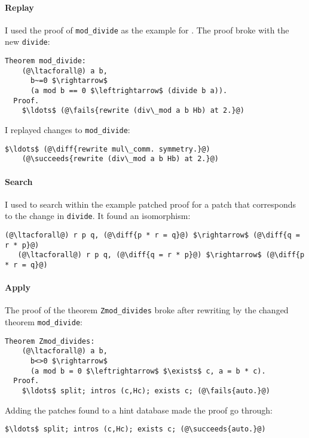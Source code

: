 \paragraph{Replay} I used the proof of \lstinline{mod_divide} as the example for \sysname.
The proof broke with the new \lstinline{divide}:

\begin{lstlisting}[language=coq]
  Theorem mod_divide:
    (@\ltacforall@) a b,
      b~=0 $\rightarrow$
      (a mod b == 0 $\leftrightarrow$ (divide b a)).
  Proof.
    $\ldots$ (@\fails{rewrite (div\_mod a b Hb) at 2.}@)
\end{lstlisting}
I replayed changes to \lstinline{mod_divide}:

\begin{lstlisting}[language=coq]
    $\ldots$ (@\diff{rewrite mul\_comm. symmetry.}@)
    (@\succeeds{rewrite (div\_mod a b Hb) at 2.}@)
\end{lstlisting}

\paragraph{Search} I used \sysname to search within the example patched proof for a patch
that corresponds to the change in \lstinline{divide}.
It found an isomorphism:

\begin{lstlisting}[language=coq]
   (@\ltacforall@) r p q, (@\diff{p * r = q}@) $\rightarrow$ (@\diff{q = r * p}@)
   (@\ltacforall@) r p q, (@\diff{q = r * p}@) $\rightarrow$ (@\diff{p * r = q}@)
\end{lstlisting}

\paragraph{Apply} The proof of the theorem \lstinline{Zmod_divides} broke after rewriting by the changed theorem \lstinline{mod_divide}:

\begin{lstlisting}[language=coq]
  Theorem Zmod_divides:
    (@\ltacforall@) a b,
      b<>0 $\rightarrow$
      (a mod b = 0 $\leftrightarrow$ $\exists$ c, a = b * c).
  Proof.
    $\ldots$ split; intros (c,Hc); exists c; (@\fails{auto.}@)
\end{lstlisting}
Adding the patches \sysname found to a hint database made the proof go through:

\begin{lstlisting}[language=coq]
    $\ldots$ split; intros (c,Hc); exists c; (@\succeeds{auto.}@)
\end{lstlisting}

